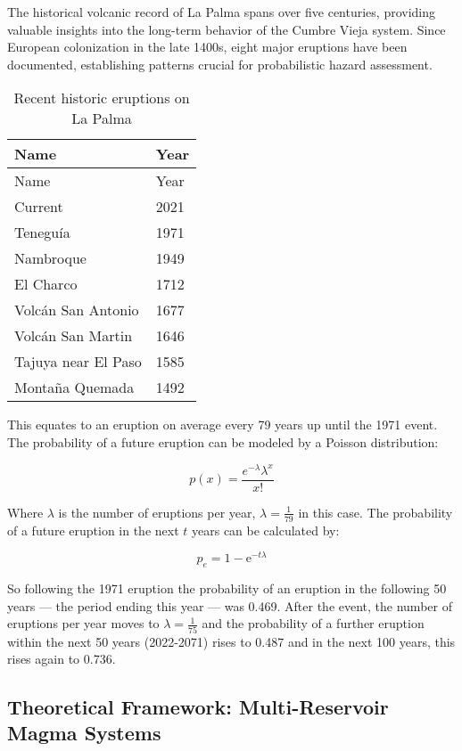 \documentclass[
  letterpaper,
]{book}
\begin{document}
The historical volcanic record of La Palma spans over five centuries,
providing valuable insights into the long-term behavior of the Cumbre
Vieja system. Since European colonization in the late 1400s, eight major
eruptions have been documented, establishing patterns crucial for
probabilistic hazard assessment.

\begin{longtable}[]{@{}ll@{}}
\caption{Recent historic eruptions on La Palma}\tabularnewline
\toprule\noalign{}
Name & Year \\
\midrule\noalign{}
\endfirsthead
\toprule\noalign{}
Name & Year \\
\midrule\noalign{}
\endhead
\bottomrule\noalign{}
\endlastfoot
Current & 2021 \\
Teneguía & 1971 \\
Nambroque & 1949 \\
El Charco & 1712 \\
Volcán San Antonio & 1677 \\
Volcán San Martin & 1646 \\
Tajuya near El Paso & 1585 \\
Montaña Quemada & 1492 \\
\end{longtable}

This equates to an eruption on average every 79 years up until the 1971
event. The probability of a future eruption can be modeled by a Poisson
distribution:

\[
p(x)=\frac{e^{-\lambda} \lambda^{x}}{x !}
\]

Where \(\lambda\) is the number of eruptions per year,
\(\lambda=\frac{1}{79}\) in this case. The probability of a future
eruption in the next \(t\) years can be calculated by:

\[
p_e = 1-\mathrm{e}^{-t \lambda}
\]

So following the 1971 eruption the probability of an eruption in the
following 50 years --- the period ending this year --- was 0.469. After
the event, the number of eruptions per year moves to
\(\lambda=\frac{1}{75}\) and the probability of a further eruption
within the next 50 years (2022-2071) rises to 0.487 and in the next 100
years, this rises again to 0.736.

\subsection{Theoretical Framework: Multi-Reservoir Magma
Systems}\label{theoretical-framework-multi-reservoir-magma-systems}
\end{document}

